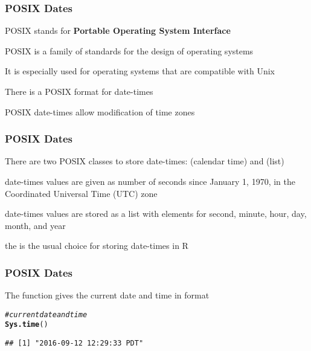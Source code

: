 \documentclass[12pt]{beamer}\usepackage[]{graphicx}\usepackage[]{color}
\makeatletter
\newcommand{\hlcom}[1]{\textcolor[rgb]{0.678,0.584,0.686}{\textit{#1}}}%
\newcommand{\hlstd}[1]{\textcolor[rgb]{0.345,0.345,0.345}{#1}}%
\newcommand{\hlkwd}[1]{\textcolor[rgb]{0.737,0.353,0.396}{\textbf{#1}}}%
\newenvironment{kframe}{%
 \def\at@end@of@kframe{}%
 \ifinner\ifhmode%
  \def\at@end@of@kframe{\end{minipage}}%
  \begin{minipage}{\columnwidth}%
 \fi\fi%
 \def\FrameCommand##1{\hskip\@totalleftmargin \hskip-\fboxsep
 \colorbox{shadecolor}{##1}\hskip-\fboxsep
     \hskip-\linewidth \hskip-\@totalleftmargin \hskip\columnwidth}%
 \MakeFramed {\advance\hsize-\width
   \@totalleftmargin\z@ \linewidth\hsize
   \@setminipage}}%
 {\par\unskip\endMakeFramed%
 \at@end@of@kframe}
\newenvironment{knitrout}{}{} %
\makeatother
\begin{document}

\begin{frame}
\frametitle{POSIX Dates}

\bi
  \item POSIX stands for \textbf{Portable Operating System Interface}
  \item POSIX is a family of standards for the design of operating systems
  \item It is especially used for operating systems that are compatible with Unix
  \item There is a POSIX format for date-times
  \item POSIX date-times allow modification of time zones
\ei

\end{frame}


\begin{frame}
\frametitle{POSIX Dates}

\bi
  \item There are two POSIX classes to store date-times:  (calendar time) and  (list)
  \item {} date-times values are given as number of seconds since January 1, 1970, in the Coordinated Universal Time (UTC) zone
  \item {} date-times values are stored as a list with elements for second, minute, hour, day, month, and year
  \item the  is the usual choice for storing date-times in R
\ei

\end{frame}


\begin{frame}[fragile]
\frametitle{POSIX Dates}

The function  gives the current date and time in  format
\begin{knitrout}\footnotesize
{}\color{fgcolor}\begin{kframe}
\begin{alltt}
\hlcom{# current date and time}
\hlkwd{Sys.time}\hlstd{()}
\end{alltt}
\begin{verbatim}
## [1] "2016-09-12 12:29:33 PDT"
\end{verbatim}
\end{kframe}
\end{knitrout}

\end{frame}
\end{document}
